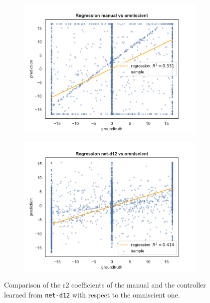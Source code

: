 \begin{figure}[!htb]
	\centering
	\begin{subfigure}[h]{0.49\textwidth}
		\centering
		\includegraphics[width=\textwidth]{contents/images/net-d12/regression-manualvsomniscient}%
	\end{subfigure}
	\hfill
	\begin{subfigure}[h]{0.49\textwidth}
		\centering
		\includegraphics[width=\textwidth]{contents/images/net-d12/regression-net-d12-vs-omniscient}
	\end{subfigure}
	\caption[Evaluation of the \gls{r2} coefficients of \texttt{net-d12} 
	.]{Comparison 
		of the \gls{r2} coefficients of the manual and the controller learned from 
		\texttt{net-d12} with respect to the omniscient one.}
	\label{fig:net-d12r2}
\end{figure}

